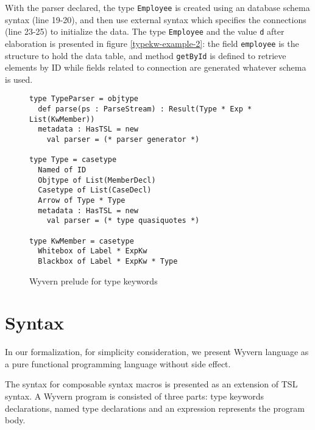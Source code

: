 \documentclass{sig-alternate}
\begin{document}
With the parser declared, the type \verb|Employee| is created using an database schema syntax (line 19-20), and then use external syntax which specifies the connections (line 23-25) to initialize the data. The type \verb|Employee| and the value \verb|d| after elaboration is presented in figure \ref{typekw-example-2}: the field \verb|employee| is the structure to hold the data table, and method \verb|getById| is defined to retrieve elements by ID while fields related to connection are generated whatever schema is used.
\begin{figure}
\begin{lstlisting}[style=wyvern]
type TypeParser = objtype
  def parse(ps : ParseStream) : Result(Type * Exp * List(KwMember))
  metadata : HasTSL = new 
    val parser = (* parser generator *)

type Type = casetype
  Named of ID
  Objtype of List(MemberDecl)
  Casetype of List(CaseDecl)
  Arrow of Type * Type
  metadata : HasTSL = new
    val parser = (* type quasiquotes *)

type KwMember = casetype
  Whitebox of Label * ExpKw
  Blackbox of Label * ExpKw * Type
\end{lstlisting}
\caption{Wyvern prelude for type keywords}
\end{figure}



\section{Syntax}
In our formalization, for simplicity consideration, we present Wyvern language as a pure functional programming language without side effect.

The syntax for composable syntax macros is presented as an extension of TSL syntax. A Wyvern program is consisted of three parts: type keywords declarations, named type declarations and an expression represents the program body. 
\end{document}
